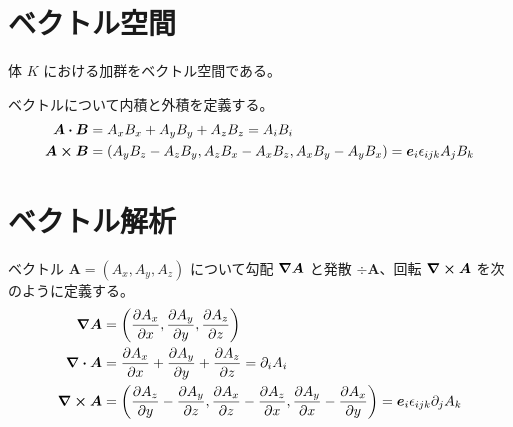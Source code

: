 \documentclass[uplatex,dvipdfmx,a4paper,11pt]{jlreq}
\newcommand{\rot}{\curl}
\theoremstyle{definition}
\begin{document}
\section{ベクトル空間}

\begin{definition}[ベクトル空間]
  体 $K$ における加群をベクトル空間である。
\end{definition}

\begin{definition}
  ベクトルについて内積と外積を定義する。
  \begin{align}
    \bm{A}\vdot\bm{B}  & = A_xB_x + A_yB_y + A_zB_z = A_iB_i                                                  \\
    \bm{A}\cross\bm{B} & = (A_yB_z - A_zB_y, A_zB_x - A_xB_z, A_xB_y - A_yB_x) = \bm{e}_i\epsilon_{ijk}A_jB_k
  \end{align}
\end{definition}

\section{ベクトル解析}
\begin{definition}
  ベクトル $\bm{A} = (A_x, A_y, A_z)$ について勾配 $\grad{\bm{A}}$ と発散 $\div{\bm{A}}$、回転 $\rot{\bm{A}}$ を次のように定義する。
  \begin{align}
    \grad{\bm{A}} & = \qty(\pdv{A_x}{x}, \pdv{A_y}{y}, \pdv{A_z}{z})                                                                                    \\
    \div{\bm{A}}  & = \pdv{A_x}{x} + \pdv{A_y}{y} + \pdv{A_z}{z} = \partial_iA_i                                                                        \\
    \rot{\bm{A}}  & = \qty(\pdv{A_z}{y} - \pdv{A_y}{z}, \pdv{A_x}{z} - \pdv{A_z}{x}, \pdv{A_y}{x} - \pdv{A_x}{y}) = \bm{e}_i\epsilon_{ijk}\partial_jA_k
  \end{align}
\end{definition}
\end{document}

